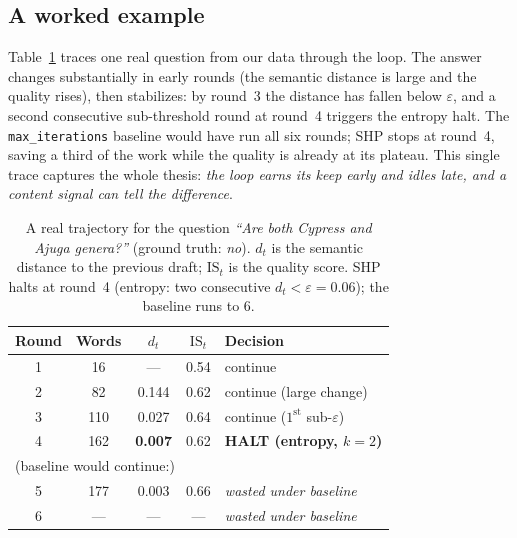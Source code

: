 \documentclass[conference]{IEEEtran}
\begin{document}
\subsection{A worked example}\label{sec:worked}
Table~\ref{tab:worked} traces one real question from our data through the loop.
The answer changes substantially in early rounds (the semantic distance is large
and the quality rises), then stabilizes: by round~3 the distance has fallen below
$\varepsilon$, and a second consecutive sub-threshold round at round~4 triggers the
entropy halt. The \texttt{max\_iterations} baseline would have run all six rounds;
SHP stops at round~4, saving a third of the work while the quality is already at
its plateau. This single trace captures the whole thesis: \emph{the loop earns its
keep early and idles late, and a content signal can tell the difference}.

\begin{table}[t]
\centering\small
\caption{A real trajectory for the question \emph{``Are both Cypress and Ajuga
genera?''} (ground truth: \emph{no}). $d_t$ is the semantic distance to the
previous draft; $\mathrm{IS}_t$ is the quality score. SHP halts at round~4
(entropy: two consecutive $d_t<\varepsilon{=}0.06$); the baseline runs to 6.}
\label{tab:worked}
\setlength{\tabcolsep}{5pt}
\begin{tabular}{ccccl}
\toprule
Round & Words & $d_t$ & $\mathrm{IS}_t$ & Decision \\
\midrule
1 & 16  & ---   & 0.54 & continue \\
2 & 82  & 0.144 & 0.62 & continue (large change) \\
3 & 110 & 0.027 & 0.64 & continue ($1^{\text{st}}$ sub-$\varepsilon$) \\
4 & 162 & \textbf{0.007} & 0.62 & \textbf{HALT (entropy, $k{=}2$)} \\
\midrule
\multicolumn{5}{l}{\footnotesize(baseline would continue:)} \\
5 & 177 & 0.003 & 0.66 & \emph{wasted under baseline} \\
6 & --- & ---   & ---  & \emph{wasted under baseline} \\
\bottomrule
\end{tabular}
\end{table}
\end{document}
